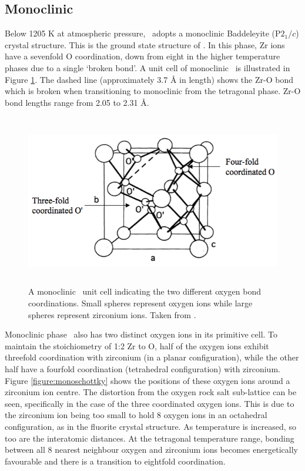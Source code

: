 \subsection{Monoclinic}

Below 1205 K at atmospheric pressure, \zirconia\ adopts a monoclinic Baddeleyite (P$2_{1}/c$) crystal structure. This is the ground state structure of \zirconia . In this phase, Zr ions have a sevenfold O coordination, down from eight in the higher temperature phases due to a single `broken bond'. A unit cell of monoclinic \zirconia\ is illustrated in Figure \ref{figure:coordination}. The dashed line (approximately 3.7 \r{A} in length) shows the Zr-O bond which is broken when transitioning to monoclinic from the tetragonal phase. Zr-O bond lengths range from 2.05 to 2.31 \r{A}.

\begin{figure}[ht] %
\centering
\includegraphics[height=7.5cm]{images/coordination.png}
\caption[A monoclinic \zirconia\ unit cell indicating the two different oxygen bond coordinations. Small spheres represent oxygen ions while large spheres represent zirconium ions.]{A monoclinic \zirconia\ unit cell indicating the two different oxygen bond coordinations. Small spheres represent oxygen ions while large spheres represent zirconium ions. Taken from \cite{Xia2010}.
\label{figure:coordination}}
\end{figure}

Monoclinic phase \zirconia\ also has two distinct oxygen ions in its primitive cell. To maintain the stoichiometry of 1:2 Zr to O, half of the oxygen ions exhibit threefold coordination with zirconium (in a planar configuration), while the other half have a fourfold coordination (tetrahedral configuration) with zirconium. Figure \ref{figure:monoschottky} shows the positions of these oxygen ions around a zirconium ion centre. The distortion from the oxygen rock salt sub-lattice can be seen, specifically in the case of the three coordinated oxygen ions. This is due to the zirconium ion being too small to hold 8 oxygen ions in an octahedral configuration, as in the fluorite crystal structure. As temperature is increased, so too are the interatomic distances. At the tetragonal temperature range, bonding between all 8 nearest neighbour oxygen and zirconium ions becomes energetically favourable and there is a transition to eightfold coordination.

